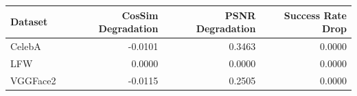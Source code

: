 \begin{tabular}{lrrr}
\toprule
Dataset & CosSim Degradation & PSNR Degradation & Success Rate Drop \\
\midrule
CelebA & -0.0101 & 0.3463 & 0.0000 \\
LFW & 0.0000 & 0.0000 & 0.0000 \\
VGGFace2 & -0.0115 & 0.2505 & 0.0000 \\
\bottomrule
\end{tabular}

